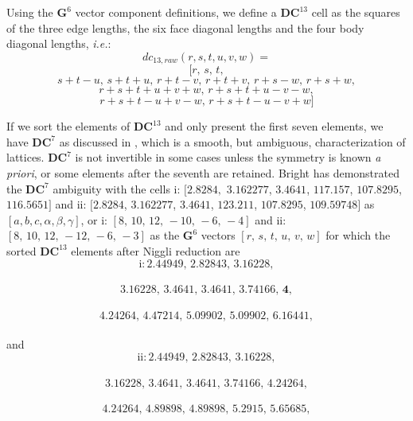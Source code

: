 \documentclass[preprint]{iucr}              %
\begin{document}
Using the $\mathbf{G}^6$ vector component definitions, we define a  $\mathbf{DC}^{13}$ cell as the squares of the three edge lengths, the six face diagonal lengths and the
four body diagonal lengths, {\it i.e.}:
\[
dc_{13,raw}(r,s,t,u,v,w)=
\]
\[
[r,\,s,\,t,
\]
\[
s+t-u,\, s+t+u,\, r+t-v,\, r+t+v,\, r+s-w,\, r+s+w, 
\]
\[
r+s+t+u+v+w,\, r+s+t+u-v-w,
\]
\[
r+s+t-u+v-w,\, r+s+t-u-v+w]
\]

If we sort the elements of $\mathbf{DC}^{13}$ and only present the first
seven elements, we have $\mathbf{DC}^{7}$ as discussed in \cite{bernstein2021},
which is a smooth, but ambiguous, characterization of lattices.  $\mathbf{DC}^{7}$ 
is not invertible in some cases unless the symmetry is known 
{\it a priori}, or some elements after the seventh are retained.  Bright
\cite{bright2021a} has demonstrated the $\mathbf{DC}^{7}$ ambiguity with
the cells i: $ [ 2.8284,$ $ 3.162277$, $ 3.4641 $, $ 117.157$, $ 107.8295$, $116.5651 ] $
and ii: $ [ 2.8284$, $ 3.162277$, $ 3.4641$, $ 123.211$, $ 107.8295$, $ 109.59748 ] $
as $ [a,b,c,\alpha,\beta,\gamma] $, or
i: $ [8,\,10,\,12,\,-10,\,-6,\,-4]$ and ii: $ [8,\,10,\,12,\,-12,\,-6,\,-3 ] $
as the $\mathbf{G}^6$ vectors $[r,\,s,\,t,\,u,\,v,\,w]$
for which the sorted $\mathbf{DC}^{13}$ elements after Niggli reduction are
~~\\

\vspace{-20mm}
\[ \text{i:}\, 2.44949,\, 2.82843,\, 3.16228,\]
~~\\

\vspace{-30mm}
\[ 3.16228,\, 3.4641,\, 3.4641,\, 3.74166,\,\mathbf{4},\]
~~\\

\vspace{-30mm}
\[4.24264,\, 4.47214,\, 5.09902,\,  5.09902,\, 6.16441, \]
~~\\

\vspace{-20mm}
\noindent{}and 
~~\\

\vspace{-20mm}
\[ \text{ii:}\, 2.44949,\, 2.82843,\, 3.16228,\]
~~\\

\vspace{-30mm}
\[ 3.16228,\, 3.4641,\, 3.4641,\, 3.74166,\, \mathbf{4.24264},\]
~~\\

\vspace{-30mm}
\[4.24264,\, 4.89898,\, 4.89898,\, 5.2915,\, 5.65685, \]
~~\\
\end{document}
